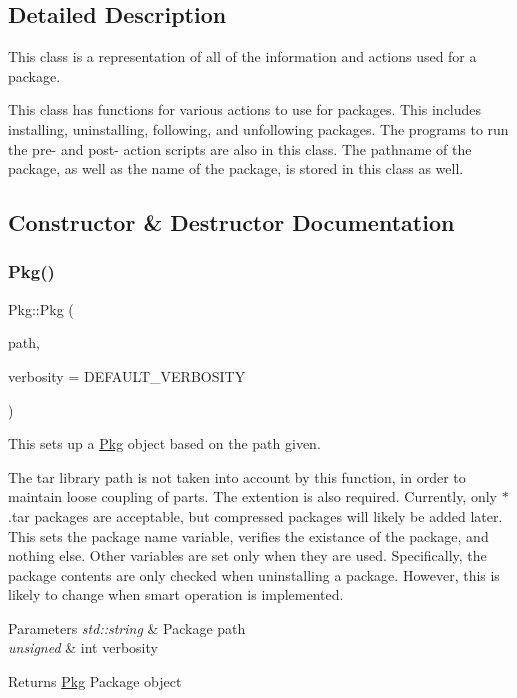\subsection{Detailed Description}
This class is a representation of all of the information and actions used for a package. 

This class has functions for various actions to use for packages. This includes installing, uninstalling, following, and unfollowing packages. The programs to run the pre-\/ and post-\/ action scripts are also in this class. The pathname of the package, as well as the name of the package, is stored in this class as well. 

\subsection{Constructor \& Destructor Documentation}
\mbox{\label{classPkg_ab1cb576aa221a08c9b84ce90aae71654}} 
\subsubsection{\texorpdfstring{Pkg()}{Pkg()}}
{\footnotesize\ttfamily Pkg\+::\+Pkg (\begin{DoxyParamCaption}\item[{std\+::string}]{path,  }\item[{unsigned int}]{verbosity = {\ttfamily DEFAULT\+\_\+VERBOSITY} }\end{DoxyParamCaption})}



This sets up a \mbox{\hyperlink{classPkg}{Pkg}} object based on the path given. 

The tar library path is not taken into account by this function, in order to maintain loose coupling of parts. The extention is also required. Currently, only $\ast$.tar packages are acceptable, but compressed packages will likely be added later. This sets the package name variable, verifies the existance of the package, and nothing else. Other variables are set only when they are used. Specifically, the package contents are only checked when uninstalling a package. However, this is likely to change when smart operation is implemented.


\begin{DoxyParams}{Parameters}
{\em std\+::string} & Package path \\
\hline
{\em unsigned} & int verbosity\\
\hline
\end{DoxyParams}
\begin{DoxyReturn}{Returns}
\mbox{\hyperlink{classPkg}{Pkg}} Package object 
\end{DoxyReturn}


